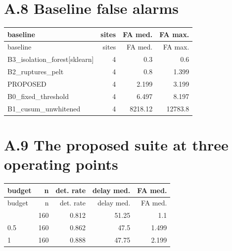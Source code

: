 \documentclass[10pt,a4paper]{article}
\begin{document}
\section*{A.8 Baseline false alarms}
{\small
\setlength{\tabcolsep}{4.5pt}
\setlength{\LTleft}{\fill}
\setlength{\LTright}{\fill}
\begin{longtable}{lrrr}
\toprule
baseline & sites & FA med. & FA max. \\
\midrule
\endfirsthead
\toprule
baseline & sites & FA med. & FA max. \\
\midrule
\endhead
\bottomrule
\endlastfoot
B3\_\allowbreak{}isolation\_\allowbreak{}forest[sklearn] & 4 & 0.3 & 0.6 \\
B2\_\allowbreak{}ruptures\_\allowbreak{}pelt & 4 & 0.8 & 1.399 \\
PROPOSED & 4 & 2.199 & 3.199 \\
B0\_\allowbreak{}fixed\_\allowbreak{}threshold & 4 & 6.497 & 8.197 \\
B1\_\allowbreak{}cusum\_\allowbreak{}unwhitened & 4 & 8218.12 & 12783.8 \\
\end{longtable}
}

\section*{A.9 The proposed suite at three operating points}
{\small
\setlength{\tabcolsep}{4.5pt}
\setlength{\LTleft}{\fill}
\setlength{\LTright}{\fill}
\begin{longtable}{lrrrr}
\toprule
budget & n & det. rate & delay med. & FA med. \\
\midrule
\endfirsthead
\toprule
budget & n & det. rate & delay med. & FA med. \\
\midrule
\endhead
\bottomrule
\endlastfoot
0.1 & 160 & 0.812 & 51.25 & 1.1 \\
0.5 & 160 & 0.862 & 47.5 & 1.499 \\
1 & 160 & 0.888 & 47.75 & 2.199 \\
\end{longtable}
}
\end{document}
